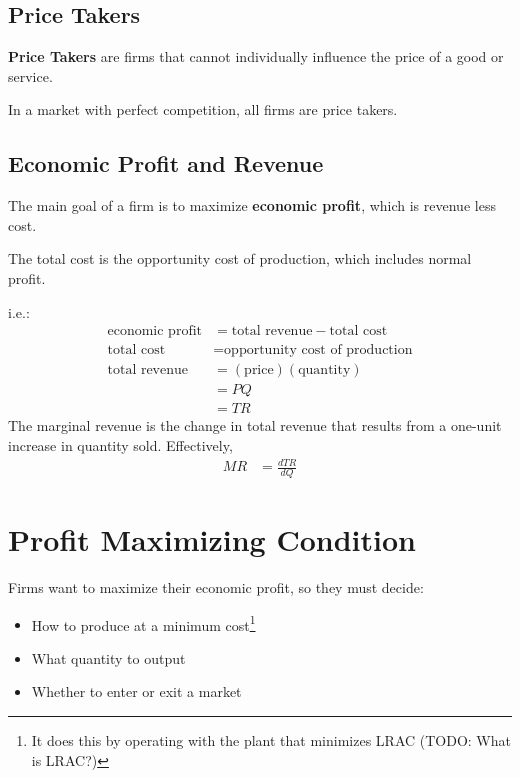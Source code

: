                 \subsection{Price Takers} %
                \label{sub:price_takers}
                    \textbf{Price Takers} are firms that cannot individually influence the price of a good or service.

                    In a market with perfect competition, all firms are price takers.
                \subsection{Economic Profit and Revenue} %
                \label{sub:economic_profit_and_revenue}
                    The main goal of a firm is to maximize \textbf{economic profit}, which is revenue less cost.

                    The total cost is the opportunity cost of production, which includes normal profit.

                    i.e.:
                    \begin{align*}
                        \text{economic profit} &= \text{total revenue} - \text{total cost} \\
                        \text{total cost} &= \text{opportunity cost of production} \\
                        \text{total revenue} &= (\text{price})(\text{quantity}) \\
                        &= P Q \\
                        &= TR
                    \end{align*}
                    The marginal revenue is the change in total revenue that results from a one-unit increase in quantity sold.
                    Effectively,
                    \begin{align*}
                        MR &= \frac{dTR}{dQ}
                    \end{align*}
            \section{Profit Maximizing Condition} %
            \label{sec:profit_maximizing_condition}
                Firms want to maximize their economic profit, so they must decide:
                \begin{itemize}
                    \item How to produce at a minimum cost\footnote{It does this by operating with the plant that minimizes LRAC (TODO: What is LRAC?)}
                    \item What quantity to output
                    \item Whether to enter or exit a market
                \end{itemize}

